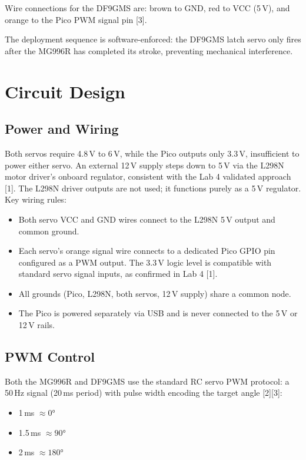 \documentclass[12pt, letterpaper]{article}
\begin{document}
Wire connections for the DF9GMS are: brown to GND, red to VCC (5\,V), and orange to the
Pico PWM signal pin [3].

The deployment sequence is software-enforced: the DF9GMS latch servo only fires after the
MG996R has completed its stroke, preventing mechanical interference.

\section{Circuit Design}
\label{sec:circuit}

\subsection{Power and Wiring}

Both servos require 4.8\,V to 6\,V, while the Pico outputs only 3.3\,V, insufficient to
power either servo. An external 12\,V supply steps down to 5\,V via the L298N motor
driver's onboard regulator, consistent with the Lab 4 validated approach [1]. The L298N
driver outputs are not used; it functions purely as a 5\,V regulator. Key wiring rules:

\begin{itemize}
    \item Both servo VCC and GND wires connect to the L298N 5\,V output and common ground.
    \item Each servo's orange signal wire connects to a dedicated Pico GPIO pin configured
          as a PWM output. The 3.3\,V logic level is compatible with standard servo signal
          inputs, as confirmed in Lab 4 [1].
    \item All grounds (Pico, L298N, both servos, 12\,V supply) share a common node.
    \item The Pico is powered separately via USB and is never connected to the 5\,V or 12\,V rails.
\end{itemize}

\subsection{PWM Control}

Both the MG996R and DF9GMS use the standard RC servo PWM protocol: a 50\,Hz signal
(20\,ms period) with pulse width encoding the target angle [2][3]:

\begin{itemize}
    \item 1\,ms $\approx 0°$
    \item 1.5\,ms $\approx 90°$
    \item 2\,ms $\approx 180°$
\end{itemize}
\end{document}
